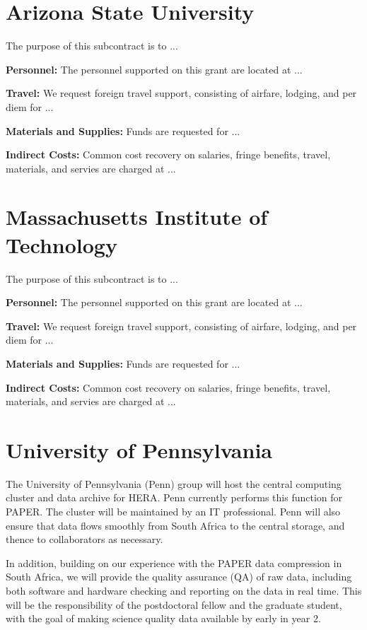 \documentclass[onecolumn,11pt]{aastex}
\begin{document}
\section*{Arizona State University}
The purpose of this subcontract is to ...

{\bf Personnel:} 
The personnel supported on this grant are located at ...

{\bf Travel:} We request foreign travel support, consisting of airfare, lodging,
and per diem for ...

{\bf Materials and Supplies:}  Funds are requested for ... 

{\bf Indirect Costs:}
Common cost recovery on salaries, fringe benefits, travel, materials, and servies are
charged at ...



\section*{Massachusetts Institute of Technology}
The purpose of this subcontract is to ...

{\bf Personnel:} 
The personnel supported on this grant are located at ...

{\bf Travel:} We request foreign travel support, consisting of airfare, lodging,
and per diem for ...

{\bf Materials and Supplies:}  Funds are requested for ... 

{\bf Indirect Costs:}
Common cost recovery on salaries, fringe benefits, travel, materials, and servies are
charged at ...



\section*{University of Pennsylvania}

The University of Pennsylvania (Penn) group will host the central computing cluster and data archive for HERA.  Penn currently performs this function for PAPER.  The cluster will be maintained by an IT professional.  Penn will also ensure that data flows smoothly from South Africa to the central storage, and thence to collaborators as necessary.

In addition, building on our experience with the PAPER data compression in South Africa, we will provide the quality assurance (QA) of raw data, including both software and hardware checking and reporting on the data in real time.  This will be the responsibility of the postdoctoral fellow and the graduate student, with the goal of making science quality data available by early in year 2.  
\end{document}
